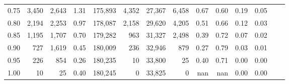 \begin{tabular}{rrrrrrrrrrrrrr}
0.75 &   3,450 &  2,643 &    1.31 &  175,893 &    4,352 &  27,367 &   6,458 &  0.67 &  0.60 &  0.19 &      0.05 \\
0.80 &   2,194 &  2,253 &    0.97 &  178,087 &    2,158 &  29,620 &   4,205 &  0.51 &  0.66 &  0.12 &      0.03 \\
0.85 &   1,195 &  1,707 &    0.70 &  179,282 &      963 &  31,327 &   2,498 &  0.39 &  0.72 &  0.07 &      0.02 \\
0.90 &     727 &  1,619 &    0.45 &  180,009 &      236 &  32,946 &     879 &  0.27 &  0.79 &  0.03 &      0.01 \\
0.95 &     226 &    854 &    0.26 &  180,235 &       10 &  33,800 &      25 &  0.40 &  0.71 &  0.00 &      0.00 \\
1.00 &      10 &     25 &    0.40 &  180,245 &        0 &  33,825 &       0 &   nan &   nan &  0.00 &      0.00 \\
\bottomrule
\end{tabular}
